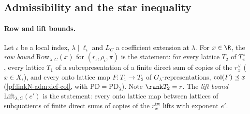 \subsection{Admissibility and the star inequality}\label{pf:linkN-adm:starsec}

\paragraph{Row and lift bounds.}
Let $\iota$ be a local index, $\lambda\mid\ell_\iota$ and $L_C$ a coefficient extension at $\lambda$. For $x\in\R$, the
\emph{row bound} $\mathrm{Row}_{\lambda,C}(x)$ for $(r_\iota,\rho_\iota,\pi)$ is the statement: for every lattice $T_2$ of
$T^\vee_\pi$, every lattice $T_1$ of a subrepresentation of a finite direct sum of copies of the $r^\vee_x$ ($x\in
X_\iota$), and every onto lattice map $F\colon T_1\to T_2$ of $G_\lambda$-representations, $\operatorname{col}(F)\preceq x$
(\cref{pf:linkN-adm:def-col}, with $\mathrm{PD}=\mathrm{PD}_\lambda$). Note $\rank T_2=r$. The \emph{lift bound}
$\mathrm{Lift}_{\lambda,C}(e')$ is the statement: every onto lattice map between lattices of subquotients of finite direct
sums of copies of the $r^{\mathrm{tw}}_x$ lifts with exponent $e'$.

